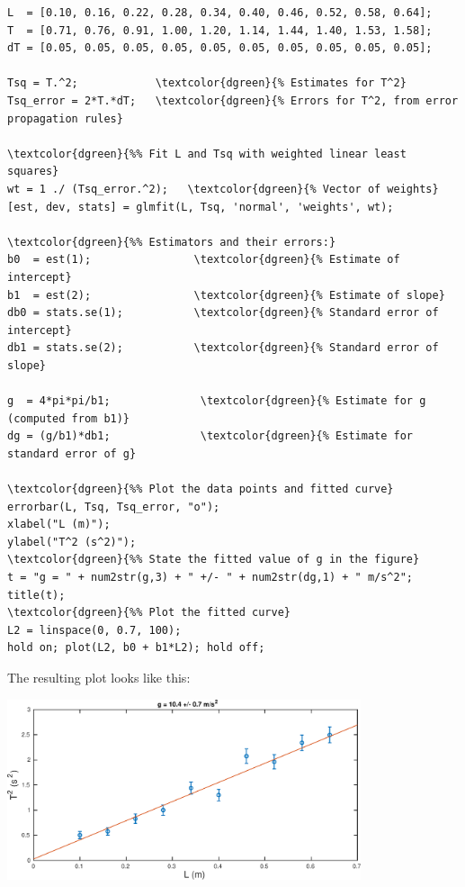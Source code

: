 \documentclass[11pt,a4paper]{article}
\begin{document}
\begin{Verbatim}[frame=single,baselinestretch=1,fontsize=\small,commandchars=\\\{\}]
L  = [0.10, 0.16, 0.22, 0.28, 0.34, 0.40, 0.46, 0.52, 0.58, 0.64];
T  = [0.71, 0.76, 0.91, 1.00, 1.20, 1.14, 1.44, 1.40, 1.53, 1.58];
dT = [0.05, 0.05, 0.05, 0.05, 0.05, 0.05, 0.05, 0.05, 0.05, 0.05];

Tsq = T.^2;            \textcolor{dgreen}{% Estimates for T^2}
Tsq_error = 2*T.*dT;   \textcolor{dgreen}{% Errors for T^2, from error propagation rules}

\textcolor{dgreen}{%% Fit L and Tsq with weighted linear least squares}
wt = 1 ./ (Tsq_error.^2);   \textcolor{dgreen}{% Vector of weights}
[est, dev, stats] = glmfit(L, Tsq, 'normal', 'weights', wt);

\textcolor{dgreen}{%% Estimators and their errors:}
b0  = est(1);                \textcolor{dgreen}{% Estimate of intercept}
b1  = est(2);                \textcolor{dgreen}{% Estimate of slope}
db0 = stats.se(1);           \textcolor{dgreen}{% Standard error of intercept}
db1 = stats.se(2);           \textcolor{dgreen}{% Standard error of slope}

g  = 4*pi*pi/b1;              \textcolor{dgreen}{% Estimate for g (computed from b1)}
dg = (g/b1)*db1;              \textcolor{dgreen}{% Estimate for standard error of g}

\textcolor{dgreen}{%% Plot the data points and fitted curve}
errorbar(L, Tsq, Tsq_error, "o");
xlabel("L (m)");
ylabel("T^2 (s^2)");
\textcolor{dgreen}{%% State the fitted value of g in the figure}
t = "g = " + num2str(g,3) + " +/- " + num2str(dg,1) + " m/s^2";
title(t);
\textcolor{dgreen}{%% Plot the fitted curve}
L2 = linspace(0, 0.7, 100);
hold on; plot(L2, b0 + b1*L2); hold off;
\end{Verbatim}
The resulting plot looks like this:
\begin{center}
  \includegraphics[width=0.78\textwidth]{errormatlab.pdf}
\end{center}
\end{document}
